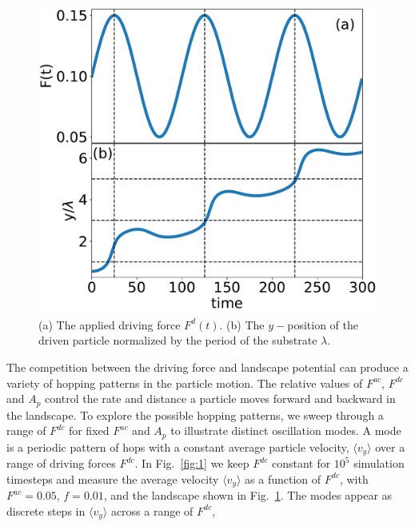 \documentclass[twocolumn,preprintnumbers,amsmath,amssymb,aps,prx]{revtex4}
\begin{document}
\begin{center}
\begin{figure}[h!]
\centering
\includegraphics[width=\columnwidth]{single_particle.pdf}
\caption{(a) The applied driving force $F^d(t)$. %
  (b) 
  The $y-$position of the driven particle
  normalized by the period of the substrate $\lambda$.
  }
\label{fig:0}
\end{figure}
\end{center}

The competition between the driving force and landscape potential
can produce a variety of hopping patterns in the particle motion. 
%
The relative values of $F^{ac}$, $F^{dc}$ and $A_p$
control the rate and distance a  particle moves 
forward and backward in the landscape.
To explore the possible hopping patterns,
we sweep through a range of $F^{dc}$ for fixed $F^{ac}$ and $A_p$
to illustrate
distinct oscillation modes. %
A mode is a periodic pattern of hops
with a constant average particle velocity, $\langle {v}_{y} \rangle$
over a range of driving forces $F^{dc}$.
In Fig.~\ref{fig:1} 
we keep $F^{dc}$ constant
for $10^5$ simulation timesteps
and 
measure the average velocity $\langle v_y \rangle $ 
as a function of $F^{dc}$,
with $F^{ac} = 0.05$, $f=0.01$, and the landscape %
shown in Fig.~\ref{fig:0}.
The modes appear as 
discrete steps in $\langle v_y \rangle$ %
across a range of $F^{dc}$,
\end{document}
